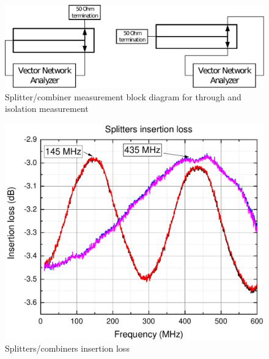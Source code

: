 \begin{figure}
    \centering
    \includegraphics[width=0.75\paperwidth]{img/7/splitter_measurement_diagram.pdf}
    \caption{Splitter/combiner measurement block diagram for through and isolation measurement}
    \label{splitter_measurement_diagram}
\end{figure}

\begin{figure}
    \centering
    \includegraphics[width=0.6\paperwidth]{img/7/splitter_amplitude.pdf}
    \caption{Splitters/combiners insertion loss}
    \label{splitter_amplitude}
\end{figure}

